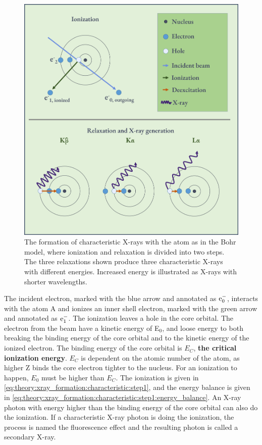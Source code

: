 \begin{figure}[ht]
    \centering
    \includegraphics[width=0.7\linewidth]{figures/characteristic_xray_formation.png}
    \caption{
        The formation of characteristic X-rays with the atom as in the Bohr model, where ionization and relaxation is divided into two steps.
        The three relaxations shown produce three characteristic X-rays with different energies.
        Increased energy is illustrated as X-rays with shorter wavelengths.
    }
    \label{fig:characteristic_xray_formation}
\end{figure}


The incident electron, marked with the blue arrow and annotated as $\textnormal{e}^-_{0}$, interacts with the atom A and ionizes an inner shell electron, marked with the green arrow and annotated as $\textnormal{e}^-_{1}$.
The ionization leaves a hole in the core orbital.
The electron from the beam have a kinetic energy of E$_{0}$, and loose energy to both breaking the binding energy of the core orbital and to the kinetic energy of the ionized electron.
The binding energy of the core orbital is $E_C$, \textbf{the critical ionization energy}.
$E_C$ is dependent on the atomic number of the atom, as higher Z binds the core electron tighter to the nucleus.
For an ionization to happen, $E_0$ must be higher than $E_C$.
The ionization is given in \cref{eq:theory:xray_formation:characteristic:step1}, and the energy balance is given in \cref{eq:theory:xray_formation:characteristic:step1:energy_balance}.
An X-ray photon with energy higher than the binding energy of the core orbital can also do the ionization.
If a characteristic X-ray photon is doing the ionization, the process is named the fluorescence effect and the resulting photon is called a secondary X-ray.

